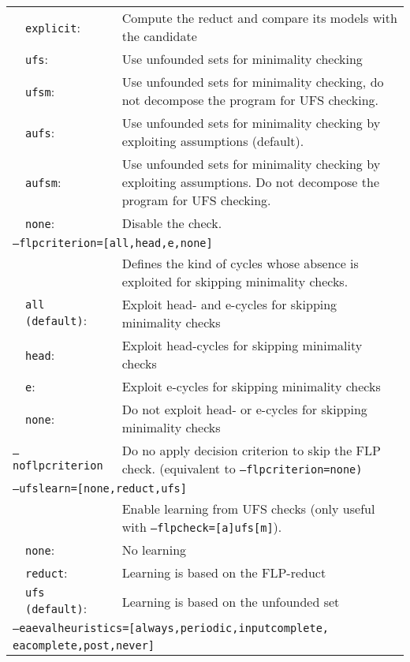 \documentclass[a4paper, titlepage]{article}
\begin{document}
\begin{longtable}{ p{2.0em} p{2.2cm} p{0.6cm} p{8.0cm} }
&\texttt{explicit}:&&Compute the reduct and compare its models with the candidate\\
&\texttt{ufs}:&&Use unfounded sets for minimality checking
\\
&\texttt{ufsm}:&&Use unfounded sets for minimality checking, do not decompose the program for UFS checking.\\
&\texttt{aufs}:&&Use unfounded sets for minimality checking by exploiting assumptions (default).\\
&\texttt{aufsm}:&&Use unfounded sets for minimality checking by exploiting assumptions. Do not decompose the program for UFS checking.\\
&\texttt{none}:&&Disable the check.\\
\multicolumn{4}{l}{\texttt{--flpcriterion=[all,head,e,none]}}\\
& & & Defines the kind of cycles whose absence is exploited for skipping minimality checks.\\
&\texttt{all (default)}:&&Exploit head- and e-cycles for skipping minimality checks\\
&\texttt{head}:&& Exploit head-cycles for skipping minimality checks\\
&\texttt{e}:&&Exploit e-cycles for skipping minimality checks\\
&\texttt{none}:&& Do not exploit head- or e-cycles for skipping minimality checks\\
\multicolumn{3}{l}{\texttt{--noflpcriterion}} &
  Do no apply decision criterion to skip the FLP check. (equivalent to \texttt{--flpcriterion=none)}\\
\multicolumn{4}{l}{\texttt{--ufslearn=[none,reduct,ufs]}} \\
&&&Enable learning from UFS checks (only useful with \texttt{--flpcheck=[a]ufs[m]}).\\
&\texttt{none}:&&No learning\\
&\texttt{reduct}:&&Learning is based on the FLP-reduct\\
&\texttt{ufs (default)}:&&Learning is based on the unfounded set\\
\multicolumn{4}{l}{\texttt{--eaevalheuristics=[always,periodic,inputcomplete,}}\\
\multicolumn{4}{l}{\texttt{\hphantom{--eaevalheuristics=[}eacomplete,post,never]}}\\

\end{longtable}
\end{document}

